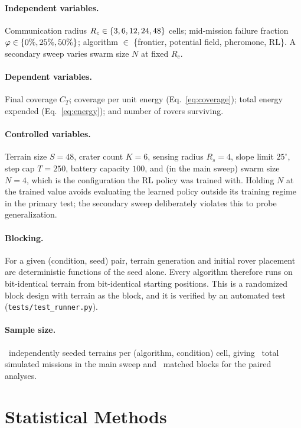\documentclass[11pt]{article}
\begin{document}
\paragraph{Independent variables.}
Communication radius $R_c \in \{3, 6, 12, 24, 48\}$ cells; mid-mission failure
fraction $\varphi \in \{0\%, 25\%, 50\%\}$; algorithm
$\in$ \{frontier, potential field, pheromone, RL\}. A secondary sweep varies
swarm size $N$ at fixed $R_c$.

\paragraph{Dependent variables.}
Final coverage $C_T$; coverage per unit energy (Eq.~\eqref{eq:coverage}); total
energy expended (Eq.~\eqref{eq:energy}); and number of rovers surviving.

\paragraph{Controlled variables.}
Terrain size $S = 48$, crater count $K = 6$, sensing radius $R_s = 4$, slope
limit $25^\circ$, step cap $T = 250$, battery capacity $100$, and (in the main
sweep) swarm size $N = 4$, which is the configuration the RL policy was trained
with. Holding $N$ at the trained value avoids evaluating the learned policy
outside its training regime in the primary test; the secondary sweep
deliberately violates this to probe generalization.

\paragraph{Blocking.}
For a given (condition, seed) pair, terrain generation and initial rover
placement are deterministic functions of the seed alone. Every algorithm
therefore runs on bit-identical terrain from bit-identical starting positions.
This is a randomized block design with terrain as the block, and it is verified
by an automated test (\texttt{tests/test\_runner.py}).

\paragraph{Sample size.}
\NSeeds\ independently seeded terrains per (algorithm, condition) cell,
giving \NTrialsMain\ total simulated missions in the main sweep and
\NBlocks\ matched blocks for the paired analyses.

\section{Statistical Methods}
\label{sec:stats}
\end{document}
